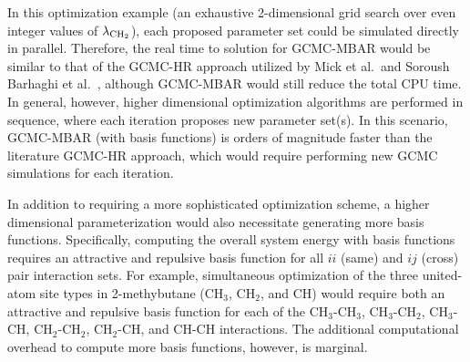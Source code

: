 \documentclass[journal=jced,manuscript=article]{achemso}
\begin{document}
In this optimization example (an exhaustive 2-dimensional grid search over even integer values of $\lambda_{\rm CH_2}$), each proposed parameter set could be simulated directly in parallel. Therefore, the real time to solution for GCMC-MBAR would be similar to that of the GCMC-HR approach utilized by Mick et al.~\cite{Potoff_branched}and Soroush Barhaghi et al.~\cite{Barhaghi2017}, although GCMC-MBAR would still reduce the total CPU time. In general, however, higher dimensional optimization algorithms are performed in sequence, where each iteration proposes new parameter set(s). In this scenario, GCMC-MBAR (with basis functions) is orders of magnitude faster than the literature GCMC-HR approach, which would require performing new GCMC simulations for each iteration.

In addition to requiring a more sophisticated optimization scheme, a higher dimensional parameterization would also necessitate generating more basis functions. Specifically, computing the overall system energy with basis functions requires an attractive and repulsive basis function for all $ii$ (same) and $ij$ (cross) pair interaction sets. For example, simultaneous optimization of the three united-atom site types in 2-methybutane (CH$_3$, CH$_2$, and CH) would require both an attractive and repulsive basis function for each of the CH$_3$-CH$_3$, CH$_3$-CH$_2$, CH$_3$-CH, CH$_2$-CH$_2$, CH$_2$-CH, and CH-CH interactions. The additional computational overhead to compute more basis functions, however, is marginal.



\end{document}
